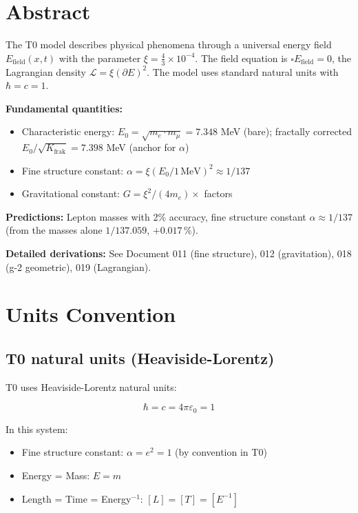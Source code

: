 \section*{Abstract}
		The T0 model describes physical phenomena through a universal energy field $E_{\text{field}}(x,t)$ with the parameter $\xi = \frac{4}{3} \times 10^{-4}$. The field equation is $\square E_{\text{field}} = 0$, the Lagrangian density $\mathcal{L} = \xi (\partial E)^2$. The model uses standard natural units with $\hbar = c = 1$.
		
		\textbf{Fundamental quantities:}
		\begin{itemize}
			\item Characteristic energy: $E_0 = \sqrt{m_e \cdot m_\mu} = 7.348$ MeV (bare); fractally corrected $E_0/\sqrt{K_{\text{frak}}} = 7.398$ MeV (anchor for $\alpha$)
			\item Fine structure constant: $\alpha = \xi(E_0/1\,\text{MeV})^2 \approx 1/137$
			\item Gravitational constant: $G = \xi^2/(4m_e) \times$ factors
		\end{itemize}
		
		\textbf{Predictions:} Lepton masses with 2\% accuracy, fine structure constant $\alpha \approx 1/137$ (from the masses alone $1/137.059$, $+0.017\,\%$).
		
		\textbf{Detailed derivations:} See Document 011 (fine structure), 012 (gravitation), 018 (g-2 geometric), 019 (Lagrangian).

	
	
	
	\section{Units Convention}
	\label{sec:units}
	
	\subsection{T0 natural units (Heaviside-Lorentz)}
	
	T0 uses Heaviside-Lorentz natural units:
	
	\begin{equation}
		\hbar = c = 4\pi\varepsilon_0 = 1
	\end{equation}
	
	In this system:
	\begin{itemize}
		\item Fine structure constant: $\alpha = e^2 = 1$ (by convention in T0)
		\item Energy = Mass: $E = m$
		\item Length = Time = Energy$^{-1}$: $[L] = [T] = [E^{-1}]$
	\end{itemize}
	
